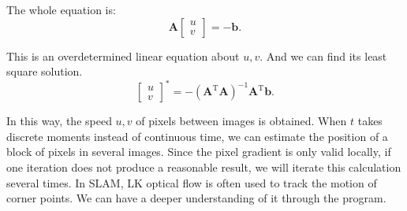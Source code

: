 {The whole equation is:
\begin{equation}
\bm{A}\left[ \begin{array}{l}
u\\
v
\end{array} \right] =  - \bm{b}.
\end{equation}

This is an overdetermined linear equation about $u,v$. And we can find its least square solution.
\begin{equation}
{\left[ \begin{array}{l}
	u\\
	v
	\end{array} \right]^*} = -{\left( {{ \bm{A}^\mathrm{T}}\bm{A}} \right)^{ - 1}}{ \bm{A}^\mathrm{T}}\bm{b}.
\end{equation}

In this way, the speed $u,v$ of pixels between images is obtained. When $t$ takes discrete moments instead of continuous time, we can estimate the position of a block of pixels in several images. Since the pixel gradient is only valid locally, if one iteration does not produce a reasonable result, we will iterate this calculation several times. In SLAM, LK optical flow is often used to track the motion of corner points. We can have a deeper understanding of it through the program.

}
